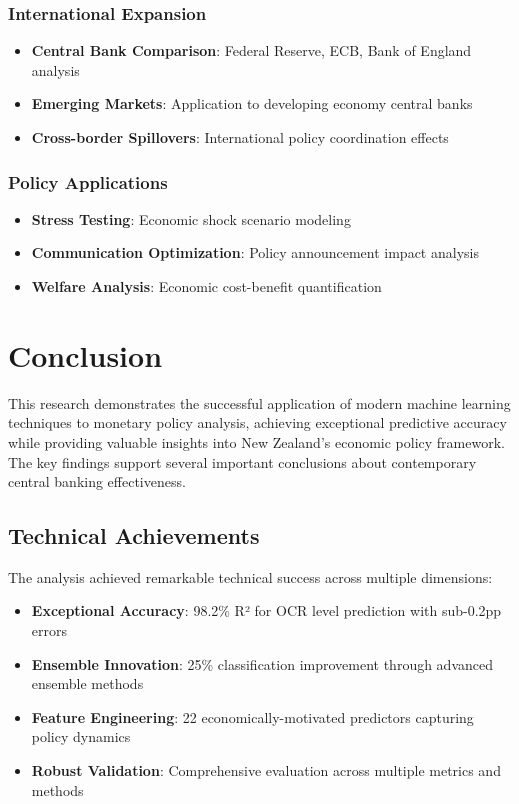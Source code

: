 \documentclass[11pt,a4paper]{article}
\begin{document}
	\subsubsection{International Expansion}
	\begin{itemize}
		\item \textbf{Central Bank Comparison}: Federal Reserve, ECB, Bank of England analysis
		\item \textbf{Emerging Markets}: Application to developing economy central banks
		\item \textbf{Cross-border Spillovers}: International policy coordination effects
	\end{itemize}
	
	\subsubsection{Policy Applications}
	\begin{itemize}
		\item \textbf{Stress Testing}: Economic shock scenario modeling
		\item \textbf{Communication Optimization}: Policy announcement impact analysis
		\item \textbf{Welfare Analysis}: Economic cost-benefit quantification
	\end{itemize}
	
	\section{Conclusion}
	
	This research demonstrates the successful application of modern machine learning techniques to monetary policy analysis, achieving exceptional predictive accuracy while providing valuable insights into New Zealand's economic policy framework. The key findings support several important conclusions about contemporary central banking effectiveness.
	
	\subsection{Technical Achievements}
	The analysis achieved remarkable technical success across multiple dimensions:
	\begin{itemize}
		\item \textbf{Exceptional Accuracy}: 98.2\% R² for OCR level prediction with sub-0.2pp errors
		\item \textbf{Ensemble Innovation}: 25\% classification improvement through advanced ensemble methods
		\item \textbf{Feature Engineering}: 22 economically-motivated predictors capturing policy dynamics
		\item \textbf{Robust Validation}: Comprehensive evaluation across multiple metrics and methods
	\end{itemize}
	
\end{document}
